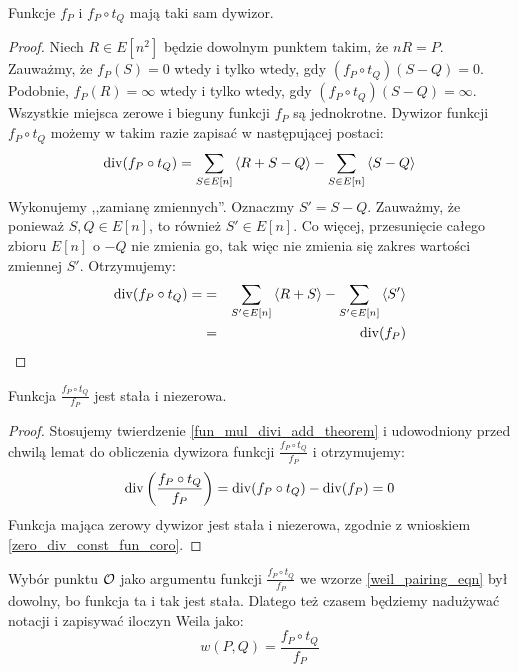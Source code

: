 \begin{lemma}\label{weil_pairing_same_divi_lemma}
Funkcje $f_P$ i $f_P \circ t_Q$ mają taki sam dywizor.
\end{lemma}

\begin{proof}
Niech $R \in E[n^2]$ będzie dowolnym punktem takim, że $nR = P$.
Zauważmy, że $f_P(S) = 0$ wtedy i tylko wtedy,
gdy $(f_P \circ t_Q)(S - Q) = 0$.
Podobnie, $f_P(R) = \infty$ wtedy i tylko wtedy,
gdy $(f_P \circ t_Q)(S - Q) = \infty$.
Wszystkie miejsca zerowe i bieguny funkcji $f_P$ są jednokrotne.
Dywizor funkcji $f_P \circ t_Q$ możemy w takim razie zapisać
w następującej postaci:
\begin{equation*}
\operatorname{div}(f_P \circ t_Q) =
\sum_{S \in E[n]} \left\langle R + S - Q\right\rangle - \sum_{S \in E[n]} \left\langle S - Q\right\rangle
\end{equation*}
Wykonujemy ,,zamianę zmiennych''. Oznaczmy $S' = S - Q$.
Zauważmy, że ponieważ $S, Q \in E[n]$, to również $S' \in E[n]$.
Co więcej, przesunięcie całego zbioru $E[n]$ o $-Q$ nie zmienia go,
tak więc nie zmienia się zakres wartości zmiennej $S'$.
Otrzymujemy:
\begin{eqnarray*}
\operatorname{div}(f_P \circ t_Q) =
& = & \sum_{S' \in E[n]} \left\langle R + S\right\rangle - \sum_{S' \in E[n]} \left\langle S'\right\rangle \\
& = & \operatorname{div}(f_P)
\end{eqnarray*}
\end{proof}

\begin{corollary}
Funkcja $\frac{f_P \circ t_Q}{f_P}$ jest stała i niezerowa.
\end{corollary}

\begin{proof}
Stosujemy twierdzenie \ref{fun_mul_divi_add_theorem}
i udowodniony przed chwilą lemat
do obliczenia dywizora funkcji $\frac{f_P \circ t_Q}{f_P}$
i otrzymujemy:
\begin{equation*}
\operatorname{div}\left(\frac{f_P \circ t_Q}{f_P}\right) =
\operatorname{div}(f_P \circ t_Q) - \operatorname{div}(f_P) = 0
\end{equation*}
Funkcja mająca zerowy dywizor jest stała i niezerowa,
zgodnie z wnioskiem \ref{zero_div_const_fun_coro}.
\end{proof}

\begin{remark}
Wybór punktu $\mathcal{O}$ jako argumentu funkcji $\frac{f_P \circ t_Q}{f_P}$
we wzorze \ref{weil_pairing_eqn} był dowolny,
bo funkcja ta i tak jest stała.
Dlatego też czasem będziemy nadużywać notacji i zapisywać
iloczyn Weila jako:
\begin{equation*}
w(P, Q) = \frac{f_P \circ t_Q}{f_P}
\end{equation*}
\end{remark}

